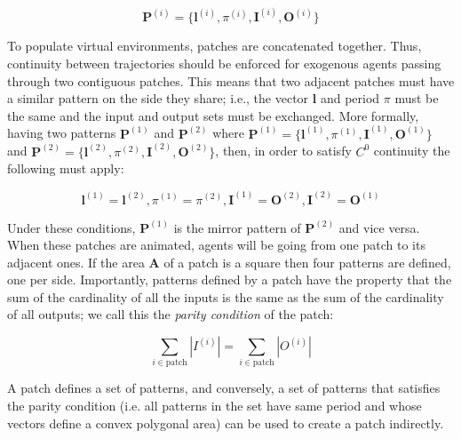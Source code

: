 \begin{equation}
	\mathbf{P}^{(i)} = \{\mathbf{l}^{(i)}, \pi^{(i)}, \mathbf{I}^{(i)}, \mathbf{O}^{(i)}\}
\end{equation}

To populate virtual environments, patches are concatenated together.
Thus, continuity between trajectories should be enforced for exogenous agents passing through two contiguous patches.
This means that two adjacent patches must have a similar pattern on the side they share; i.e., the vector $\mathbf{l}$ and period $\pi$ must be the same and the input and output sets must be exchanged.
More formally, having two patterns $\mathbf{P}^{(1)}$ and $\mathbf{P}^{(2)}$ where
$\mathbf{P}^{(1)}=\{\mathbf{l}^{(1)}, \pi^{(1)}, \mathbf{I}^{(1)}, \mathbf{O}^{(1)}\}$ and
$\mathbf{P}^{(2)}=\{\mathbf{l}^{(2)}, \pi^{(2)}, \mathbf{I}^{(2)}, \mathbf{O}^{(2)}\}$, then, in order to satisfy $C^0$ continuity the following must apply:

\begin{equation}
	\mathbf{l}^{(1)}=\mathbf{l}^{(2)}, \pi^{(1)}=\pi^{(2)}, \mathbf{I}^{(1)} = \mathbf{O}^{(2)}, \mathbf{I}^{(2)} = \mathbf{O}^{(1)}
\end{equation}

Under these conditions, $\mathbf{P}^{(1)}$ is the mirror pattern of $\mathbf{P}^{(2)}$ and vice versa.
When these patches are animated, agents will be going from one patch to its adjacent ones. 
If the area $\mathbf{A}$ of a patch is a square then four  patterns are defined, one per side.
Importantly, patterns defined by a patch have the property that the sum of the cardinality of all the inputs is the same as the sum of the cardinality of all outputs; we call this the \emph{parity condition} of the patch:

$$\sum_{i \in \text{patch}}|I^{(i)}| = \sum_{i \in \text{patch}}|O^{(i)}|$$

A patch defines a set of patterns, and conversely, a set of patterns that satisfies the parity condition (i.e. all patterns in the set have same period and whose vectors define a convex polygonal area) can be used to create a patch indirectly.

% 


